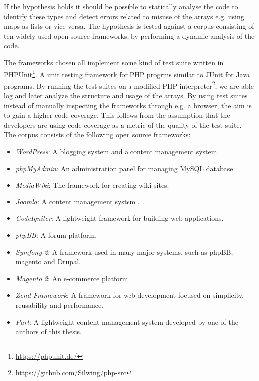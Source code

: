 If the hypothesis holds it should be possible to statically analyse the code to identify these types and detect errors related to misuse of the arrays e.g. using maps as lists or vice versa. The hypothesis is tested against a corpus consisting of ten widely used open source frameworks, by performing a dynamic analysis of the code.

The frameworks chosen all implement some kind of test suite written in PHPUnit\footnote{\url{https://phpunit.de/}}. A unit testing framework for PHP progrms similar to JUnit for Java programs. By running the test suites on a modified PHP interpreter\footnote{https://github.com/Silwing/php-src}, we are able log and later analyze the structure and usage of the arrays. By using test suites instead of manually inspecting the frameworks through e.g. a browser, the aim is to gain a higher code coverage. This follows from the assumption that the developers are using code coverage as a metric of the quality of the test-suite. The corpus consists of the following open source frameworks:

\begin{itemize}
    \item \emph{WordPress}: A blogging system and a content management system.
    \item \emph{phpMyAdmin}: An administration panel for managing MySQL database.
    \item \emph{MediaWiki}: The framework for creating wiki sites.
    \item \emph{Joomla}: A content management system .
    \item \emph{CodeIgniter}: A lightweight framework for building web applications.
    \item \emph{phpBB}: A forum platform.
    \item \emph{Symfony 2}: A framework used in many major systems, such as phpBB, magento and Drupal.
    \item \emph{Magento 2}: An e-commerce platform.
    \item \emph{Zend Framework}: A framework for web development focused on simplicity, reusability and performance.
    \item \emph{Part}: A lightweight content management system developed by one of the authors of this thesis.
\end{itemize}


